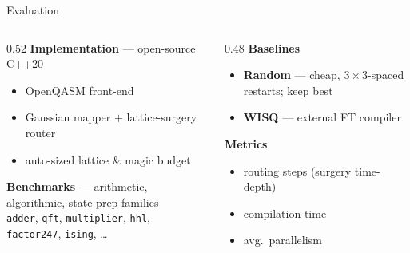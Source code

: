 \documentclass[aspectratio=169,10pt]{beamer}
\begin{document}
\begin{frame}{Evaluation}
  \begin{columns}[T]
  \begin{column}{0.52\textwidth}
    \footnotesize
    \textbf{Implementation} --- open-source C++20
    \begin{itemize}
      \item OpenQASM front-end
      \item Gaussian mapper $+$ lattice-surgery router
      \item auto-sized lattice \& magic budget
    \end{itemize}
    \vspace{4pt}
    \textbf{Benchmarks} --- arithmetic, algorithmic, state-prep families\\
    {\scriptsize \texttt{adder}, \texttt{qft}, \texttt{multiplier}, \texttt{hhl}, \texttt{factor247}, \texttt{ising}, \dots}
  \end{column}
  \begin{column}{0.48\textwidth}
    \footnotesize
    \textbf{Baselines}
    \begin{itemize}
      \item \textcolor{ftgray}{\textbf{Random}} --- cheap, $3{\times}3$-spaced restarts; keep best
      \item \textcolor{ftgray}{\textbf{WISQ}} --- external FT compiler
    \end{itemize}
    \vspace{4pt}
    \textbf{Metrics}
    \begin{itemize}
      \item routing \alert{steps} (surgery time-depth)
      \item compilation time
      \item avg.\ parallelism
    \end{itemize}
  \end{column}
  \end{columns}

  \vspace{0.25cm}
  \centering
\end{frame}
\end{document}
